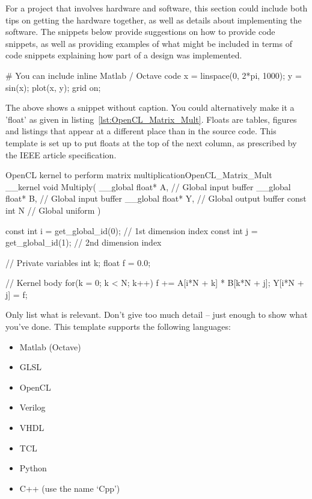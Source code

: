 For a project that involves hardware and software, this section could include both tips on getting the hardware together, as well as details about implementing the software. The snippets below provide suggestions on how to provide code snippets, as well as providing examples of what might be included in terms of code snippets explaining how part of a design was implemented.

\begin{Matlab}
  # You can include inline Matlab / Octave code
  x = linspace(0, 2*pi, 1000);
  y = sin(x);
  plot(x, y); grid on;
\end{Matlab}

The above shows a snippet without caption. You could alternatively make it a 'float' as given in listing~\ref{lst:OpenCL_Matrix_Mult}.  Floats are tables, figures and listings that appear at a different place than in the source code.  This template is set up to put floats at the top of the next column, as prescribed by the IEEE article specification.

\begin{OpenCL_float}{OpenCL kernel to perform matrix multiplication}{OpenCL_Matrix_Mult}
  __kernel void Multiply(
    __global float* A, // Global input buffer
    __global float* B, // Global input buffer
    __global float* Y, // Global output buffer
    const    int    N  // Global uniform
  ){
    const int i = get_global_id(0); // 1st dimension index
    const int j = get_global_id(1); // 2nd dimension index
    
    // Private variables
    int   k;
    float f = 0.0;
    
    // Kernel body
    for(k = 0; k < N; k++) f += A[i*N + k] * B[k*N + j];
    Y[i*N + j] = f;
  }
\end{OpenCL_float}

Only list what is relevant.  Don't give too much detail -- just enough to show what you've done.  This template supports the following languages:

\begin{itemize}
  \item Matlab (Octave)
  \item GLSL
  \item OpenCL
  \item Verilog
  \item VHDL
  \item TCL
  \item Python
  \item C++ (use the name `Cpp')
\end{itemize}

